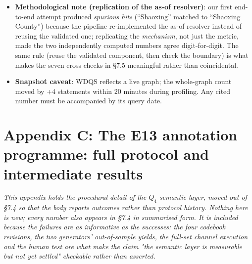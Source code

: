 \begin{itemize}
\item \textbf{Methodological note (replication of the as-of resolver)}: our first end-to-end attempt produced \emph{spurious hits} (``Shaoxing'' matched to ``Shaoxing County'') because the pipeline re-implemented the as-of resolver instead of reusing the validated one; replicating the \emph{mechanism}, not just the metric, made the two independently computed numbers agree digit-for-digit. The same rule (reuse the validated component, then check the boundary) is what makes the seven cross-checks in \S7.5 meaningful rather than coincidental.
\item \textbf{Snapshot caveat}: WDQS reflects a live graph; the whole-graph count moved by +4 statements within 20 minutes during profiling. Any cited number must be accompanied by its query date.
\end{itemize}

\section*{Appendix C: The E13 annotation programme: full protocol and intermediate results}

\emph{This appendix holds the procedural detail of the $Q_4$ semantic layer, moved out of \S7.4 so that the body reports outcomes rather than protocol history. Nothing here is new; every number also appears in \S7.4 in summarised form. It is included because the failures are as informative as the successes: the four codebook revisions, the two generators' out-of-sample yields, the full-set channel execution and the human test are what make the claim "the semantic layer is measurable but not yet settled" checkable rather than asserted.}

